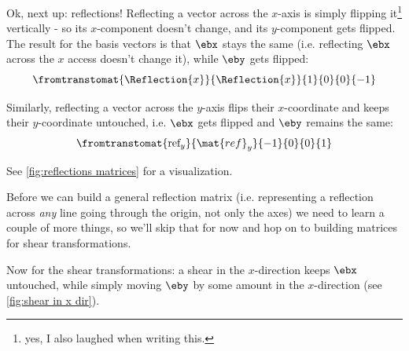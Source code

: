 Ok, next up: reflections! Reflecting a vector across the $x$-axis is simply flipping it\footnote{yes, I also laughed when writing this.} vertically - so its $x$-component doesn't change, and its $y$-component gets flipped. The result for the basis vectors is that $\ebx$ stays the same (i.e. reflecting $\ebx$ across the $x$ access doesn't change it), while $\eby$ gets flipped:
\begin{equation}
	\fromtranstomat{\Reflection{x}}{\Reflection{x}}{1}{0}{0}{-1}
	\label{eq:vertical reflection matrix}
\end{equation}

Similarly, reflecting a vector across the $y$-axis flips their $x$-coordinate and keeps their $y$-coordinate untouched, i.e. $\ebx$ gets flipped and $\eby$ remains the same:
\begin{equation}
	\fromtranstomat{\text{ref}_{y}}{\mat{ref}_{y}}{-1}{0}{0}{1}
	\label{eq:horizontal reflection matrix}
\end{equation}

See \autoref{fig:reflections matrices} for a visualization.

Before we can build a general reflection matrix (i.e. representing a reflection across \textit{any} line going through the origin, not only the axes) we need to learn a couple of more things, so we'll skip that for now and hop on to building matrices for shear transformations.

Now for the shear transformations: a shear in the $x$-direction keeps $\ebx$ untouched, while simply moving $\eby$ by some amount in the $x$-direction (see \autoref{fig:shear in x dir}).

